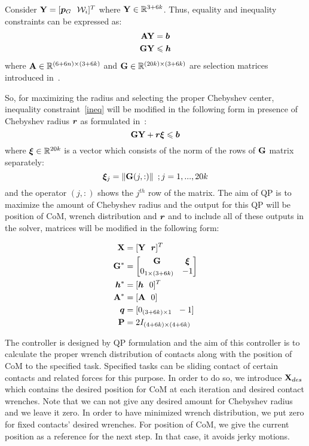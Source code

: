 \documentclass[letterpaper, 10pt, conference]{ieeeconf}
\begin{document}
Consider $\bfY = [\bfp_G \ \ \calW_{i}]^T$ where $\mathbf{Y} \in {\mathbb{R}}^{3+6k}$. Thus, equality and inequality constraints can be expressed as:
\begin{subequations}
	\begin{align}
	\mathbf{A} \mathbf{Y} &= \bm{b} \label{eq} \\
	\mathbf{G} \mathbf{Y} &\leqslant \bm{h} \label{ineq}
	\end{align}
\end{subequations}
where $\mathbf{A} \in {\mathbb{R}}^{(6+6n)\times(3+6k)}$ and $\mathbf{G}\in {\mathbb{R}}^{(20k)\times(3+6k)}$ are selection matrices introduced in~\cite{Samadi2019HAL}. 



So, for maximizing the radius and selecting the proper Chebyshev center, inequality constraint~\eqref{ineq} will be modified in the following form in presence of Chebyshev radius $\bm{r}$ as formulated in~\cite{Knitter1988}:
\begin{equation}
 \mathbf{G} \mathbf{Y}+\bm{r} \boldsymbol{\xi} \leqslant \bm{b}
\end{equation}
where $\boldsymbol{\xi} \in {\mathbb{R}}^{20k}$ is a vector which consists of the norm of the rows of $\mathbf{G}$ matrix separately:
\begin{equation}
\boldsymbol{\xi}_j = \left\lVert\mathbf{G}(j,:)\right\rVert \ ; j=1,...,20k
\end{equation}
and the operator $(j,:)$ shows the $j^{th}$ row of the matrix. The aim of QP is to maximize the amount of Chebyshev radius and the output for this QP will be position of CoM, wrench distribution and $\bm{r}$ and to include all of these outputs in the solver, matrices will be modified in the following form:

\begin{align}
\mathbf{X} &= [\mathbf{Y} \ \ \bm{r}]^T \\
\mathbf{G}^* &=\begin{bmatrix}
\mathbf{G} & \boldsymbol{\xi} \\
0_{1 \times (3+6k)} & -1
\end{bmatrix} \\
\bm{h}^* &= [\bm{h} \ \ 0]^T \\
\mathbf{A}^* &= [\mathbf{A} \ \ 0] \\
\bm{q} &= [0_{(3+6k) \times 1} \ \ -1] \\
\mathbf{P} &= 2I_{(4+6k) \times (4+6k)}
\end{align}

The controller is designed by QP formulation and the aim of this controller is to calculate the proper wrench distribution of contacts along with the position of CoM to the specified task. Specified tasks can be sliding contact of certain contacts and related forces for this purpose. In order to do so, we introduce $\mathbf{X}_{des}$ which contains the desired position for CoM at each iteration and desired contact wrenches. Note that we can not give any desired amount for Chebyshev radius and we leave it zero. In order to have minimized wrench distribution, we put zero for fixed contacts' desired wrenches. For position of CoM, we give the current position as a reference for the next step. In that case, it avoids jerky motions.
\end{document}

